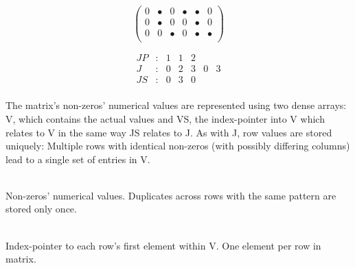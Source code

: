     \begin{figure}[ht]
      \centering
      \captionsetup{width=.9\textwidth}
      \begin{minipage}{0.4\textwidth}
        \centering
        $$
        \begin{pmatrix}
          0 & \bullet & 0 & \bullet & \bullet & 0 \\
          0 & \bullet & 0 & 0 & \bullet & 0 \\
          0 & 0 & \bullet & 0 & \bullet & \bullet \\
        \end{pmatrix}
        $$
      \end{minipage}
      \begin{minipage}{0.4\textwidth}
        \centering
        $$
        \begin{matrix}
          JP & : & 1 & 1 & 2 &   &   \\
           J & : & 0 & 2 & 3 & 0 & 3 \\
          JS & : & 0 & 3 & 0 &   &   \\
        \end{matrix}
        $$
      \end{minipage}
      \label{fig:c3sr_example_structure}
    \end{figure}

    The matrix's non-zeros' numerical values are represented using two dense arrays: V, which contains the actual values
    and VS, the index-pointer into V which relates to V in the same way JS relates to J. As with J, row values are
    stored uniquely: Multiple rows with identical non-zeros (with possibly differing columns) lead to a single set of
    entries in V.

    \begin{description}[align = left, labelwidth = 4cm]
      \item [V - \emph{Values}] \hfill \\
        Non-zeros' numerical values. Duplicates across rows with the same pattern are stored only once.
      \item [VS - \emph{Values' index-pointers}] \hfill \\
        Index-pointer to each row's first element within V. One element per row in matrix.
    \end{description}

